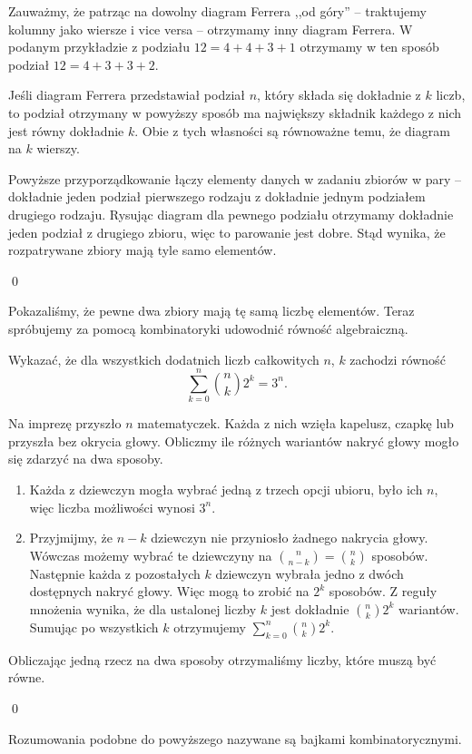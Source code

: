 Zauważmy, że patrząc na dowolny diagram Ferrera ,,od góry'' -- traktujemy kolumny jako wiersze i vice versa -- otrzymamy inny diagram Ferrera. W podanym przykładzie z podziału $12 = 4 + 4 + 3 + 1$ otrzymamy w ten sposób podział $12 = 4 + 3 + 3 + 2$.

Jeśli diagram Ferrera przedstawiał podział $n$, który składa się dokładnie z $k$ liczb, to podział otrzymany w powyższy sposób ma największy składnik każdego z nich jest równy dokładnie $k$. Obie z tych własności są równoważne temu, że diagram na $k$ wierszy.

Powyższe przyporządkowanie łączy elementy danych w zadaniu zbiorów w pary -- dokładnie jeden podział pierwszego rodzaju z dokładnie jednym podziałem drugiego rodzaju. Rysując diagram dla pewnego podziału otrzymamy dokładnie jeden podział z drugiego zbioru, więc to parowanie jest dobre. Stąd wynika, że rozpatrywane zbiory mają tyle samo elementów.

\qed

\vspace{10px}

\noindent
Pokazaliśmy, że pewne dwa zbiory mają tę samą liczbę elementów. Teraz spróbujemy za pomocą kombinatoryki udowodnić równość algebraiczną.

\vspace{5px}



\noindent
Wykazać, że dla wszystkich dodatnich liczb całkowitych $n$, $k$ zachodzi równość
\[
    \sum^{n}_{k=0} {{n}\choose{k}} 2^k = 3^n.
\]

\vspace{5px}


\vspace{5px}

\noindent
Na imprezę przyszło $n$ matematyczek. Każda z nich wzięła kapelusz, czapkę lub przyszła bez okrycia głowy. Obliczmy ile różnych wariantów nakryć głowy mogło się zdarzyć na dwa sposoby.
\begin{enumerate}
    \item Każda z dziewczyn mogła wybrać jedną z trzech opcji ubioru, było ich $n$, więc liczba możliwości wynosi $3^n$.
    \item Przyjmijmy, że $n - k$ dziewczyn nie przyniosło żadnego nakrycia głowy. 
    Wówczas możemy wybrać te dziewczyny na ${{n}\choose{n - k}} = {{n}\choose{k}}$ sposobów. 
    Następnie każda z pozostałych $k$ dziewczyn wybrała jedno z dwóch dostępnych nakryć głowy. 
    Więc mogą to zrobić na $2^k$ sposobów. Z reguły mnożenia wynika, że dla ustalonej liczby $k$ jest dokładnie ${{n}\choose{k}} 2^k$ wariantów. Sumując po wszystkich $k$ otrzymujemy $\sum^{n}_{k=0} {{n}\choose{k}} 2^k$.
\end{enumerate}

\noindent
Obliczając jedną rzecz na dwa sposoby otrzymaliśmy liczby, które muszą być równe.

\qed

\vspace{10px}

\noindent
Rozumowania podobne do powyższego nazywane są bajkami kombinatorycznymi.

\vspace{10px}